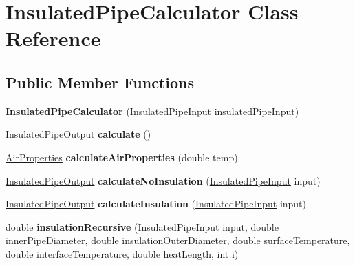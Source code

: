 \hypertarget{class_insulated_pipe_calculator}{}\section{Insulated\+Pipe\+Calculator Class Reference}
\label{class_insulated_pipe_calculator}
\subsection*{Public Member Functions}
\begin{DoxyCompactItemize}
\item 
\mbox{\label{class_insulated_pipe_calculator_a829afd10d8b97bb5bcfd936b5b153ce5}} 
{\bfseries Insulated\+Pipe\+Calculator} (\hyperlink{class_insulated_pipe_input}{Insulated\+Pipe\+Input} insulated\+Pipe\+Input)
\item 
\mbox{\label{class_insulated_pipe_calculator_a12cf1b2f8aa76989c6e805cbedfe0b2a}} 
\hyperlink{class_insulated_pipe_output}{Insulated\+Pipe\+Output} {\bfseries calculate} ()
\item 
\mbox{\label{class_insulated_pipe_calculator_ac23f5e548594269d1548f9959906c988}} 
\hyperlink{class_air_properties}{Air\+Properties} {\bfseries calculate\+Air\+Properties} (double temp)
\item 
\mbox{\label{class_insulated_pipe_calculator_a47aba38ca8bcf6c4e873fdda75e7c982}} 
\hyperlink{class_insulated_pipe_output}{Insulated\+Pipe\+Output} {\bfseries calculate\+No\+Insulation} (\hyperlink{class_insulated_pipe_input}{Insulated\+Pipe\+Input} input)
\item 
\mbox{\label{class_insulated_pipe_calculator_a6cca6d6e69ee7c30dd68123678412652}} 
\hyperlink{class_insulated_pipe_output}{Insulated\+Pipe\+Output} {\bfseries calculate\+Insulation} (\hyperlink{class_insulated_pipe_input}{Insulated\+Pipe\+Input} input)
\item 
\mbox{\label{class_insulated_pipe_calculator_a56eff4f9840a7c9dfc49c3ad99183660}} 
double {\bfseries insulation\+Recursive} (\hyperlink{class_insulated_pipe_input}{Insulated\+Pipe\+Input} input, double inner\+Pipe\+Diameter, double insulation\+Outer\+Diameter, double surface\+Temperature, double interface\+Temperature, double heat\+Length, int i)

\end{DoxyCompactItemize}
